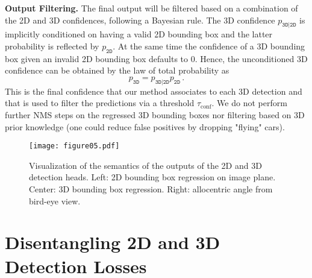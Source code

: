 \documentclass[10pt,twocolumn,letterpaper]{article}
\renewcommand{\paragraph}[1]{

        \vspace{3pt}
	\noindent\textbf{#1}}
\begin{document}
\paragraph{Output Filtering.}
The final output will be filtered based on a combination of the 2D and 3D confidences, following a Bayesian rule. The 3D confidence $p_\mathtt{3D|2D}$ is implicitly conditioned on having a valid 2D bounding box and the latter probability is reflected by $p_\mathtt{2D}$. At the same time the confidence of a 3D bounding box given an invalid 2D bounding box defaults to $0$. Hence, the unconditioned 3D confidence can be obtained by the law of total probability as
\[
p_\mathtt{3D}=p_\mathtt{3D|2D}p_\mathtt{2D}\,.
\]
This is the final confidence that our method associates to each 3D detection and that is used to filter the predictions via a threshold $\tau_\text{conf}$.
We do not perform further NMS steps on the regressed 3D bounding boxes nor filtering based on 3D prior knowledge (\eg one could reduce false positives by dropping "flying" cars).


\begin{figure}
    \centering
    \texttt{[image: figure05.pdf]}
    \caption{Visualization of the semantics of the outputs of the 2D and 3D detection heads. Left: 2D bounding box regression on image plane. Center: 3D bounding box regression. Right: allocentric angle from bird-eye view. }
    \label{fig:notation}
    \vspace{-12pt}
\end{figure}

\section{Disentangling 2D and 3D Detection Losses}\label{sec:disentangling}
\end{document}
